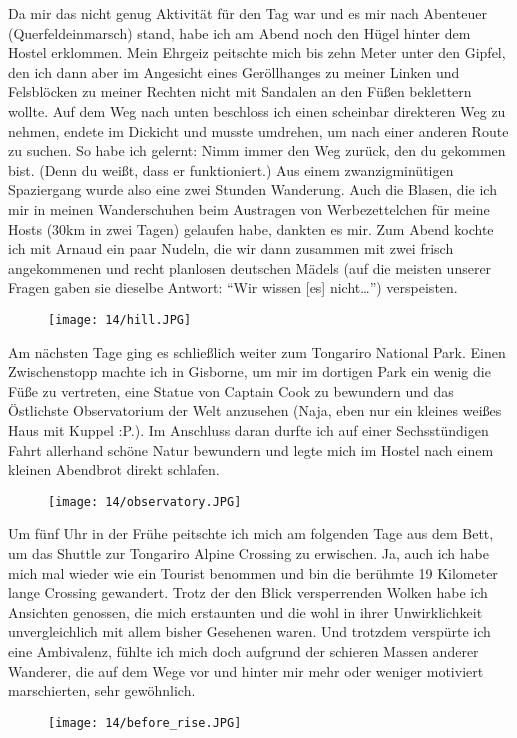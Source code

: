 Da mir das nicht genug Aktivität für den Tag war und es mir nach
Abenteuer (Querfeldeinmarsch) stand, habe ich am Abend noch den Hügel
hinter dem Hostel erklommen. Mein Ehrgeiz peitschte mich bis zehn Meter
unter den Gipfel, den ich dann aber im Angesicht eines Geröllhanges zu
meiner Linken und Felsblöcken zu meiner Rechten nicht mit Sandalen an
den Füßen beklettern wollte. Auf dem Weg nach unten beschloss ich einen
scheinbar direkteren Weg zu nehmen, endete im Dickicht und musste
umdrehen, um nach einer anderen Route zu suchen. So habe ich gelernt:
Nimm immer den Weg zurück, den du gekommen bist. (Denn du weißt, dass er
funktioniert.) Aus einem zwanzigminütigen Spaziergang wurde also eine
zwei Stunden Wanderung. Auch die Blasen, die ich mir in meinen
Wanderschuhen beim Austragen von Werbezettelchen für meine Hosts (30km
in zwei Tagen) gelaufen habe, dankten es mir. Zum Abend kochte ich mit
Arnaud ein paar Nudeln, die wir dann zusammen mit zwei frisch
angekommenen und recht planlosen deutschen Mädels (auf die meisten
unserer Fragen gaben sie dieselbe Antwort: ``Wir wissen {[}es{]}
nicht\ldots'') verspeisten.
\begin{figure}[h]
  \centering
  \texttt{[image: 14/hill.JPG]}
\end{figure}

Am nächsten Tage ging es schließlich weiter zum Tongariro National Park.
Einen Zwischenstopp machte ich in Gisborne, um mir im dortigen Park ein
wenig die Füße zu vertreten, eine Statue von Captain Cook zu bewundern
und das Östlichste Observatorium der Welt anzusehen (Naja, eben nur ein
kleines weißes Haus mit Kuppel :P.). Im Anschluss daran durfte ich auf
einer Sechsstündigen Fahrt allerhand schöne Natur bewundern und legte
mich im Hostel nach einem kleinen Abendbrot direkt schlafen.
\begin{figure}[h]
  \centering
  \texttt{[image: 14/observatory.JPG]}
\end{figure}

Um fünf Uhr in der Frühe peitschte ich mich am folgenden Tage aus dem
Bett, um das Shuttle zur Tongariro Alpine Crossing zu erwischen. Ja,
auch ich habe mich mal wieder wie ein Tourist benommen und bin die
berühmte 19 Kilometer lange Crossing gewandert. Trotz der den Blick
versperrenden Wolken habe ich Ansichten genossen, die mich erstaunten
und die wohl in ihrer Unwirklichkeit unvergleichlich mit allem bisher
Gesehenen waren. Und trotzdem verspürte ich eine Ambivalenz, fühlte ich
mich doch aufgrund der schieren Massen anderer Wanderer, die auf dem
Wege vor und hinter mir mehr oder weniger motiviert marschierten, sehr
gewöhnlich.
\begin{figure}[h]
  \centering
  \texttt{[image: 14/before\_rise.JPG]}
\end{figure}

